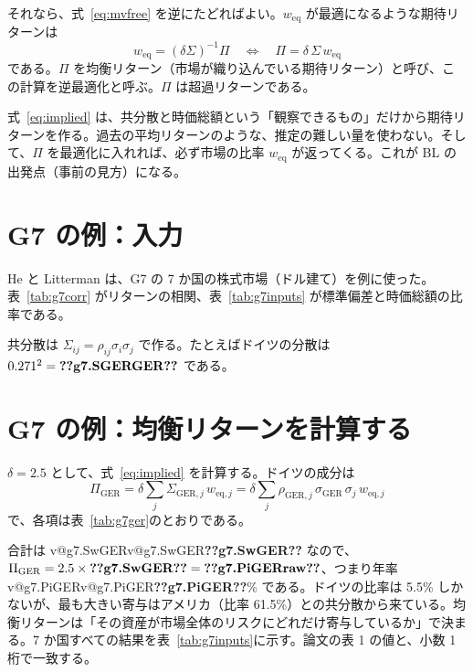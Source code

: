 \documentclass[xelatex,ja=standard,jafont=hiragino-pron,a4paper,11pt,openany]{bxjsreport}
\makeatletter
\newcommand{\V}[1]{\ifcsname v@#1\endcsname\csname v@#1\endcsname\else\textbf{??#1??}\fi}
\newcommand{\tabin}[1]{\adjustbox{max width=\linewidth}{}}
\newcommand{\weq}{w_{\mathrm{eq}}}
\newcommand{\tabref}[1]{表~\ref{#1}}
\makeatother
\begin{document}
それなら、式~\eqref{eq:mvfree} を逆にたどればよい。$\weq$ が最適になるような期待リターンは
\begin{equation}
\weq = (\delta\Sigma)^{-1}\Pi
\quad\Longleftrightarrow\quad
\Pi = \delta\,\Sigma\,\weq
\label{eq:implied}
\end{equation}
である。$\Pi$ を均衡リターン（市場が織り込んでいる期待リターン）と呼び、この計算を逆最適化と呼ぶ。$\Pi$ は超過リターンである。

式~\eqref{eq:implied} は、共分散と時価総額という「観察できるもの」だけから期待リターンを作る。過去の平均リターンのような、推定の難しい量を使わない。そして、$\Pi$ を最適化に入れれば、必ず市場の比率 $\weq$ が返ってくる。これが BL の出発点（事前の見方）になる。

\section{G7 の例：入力}

He と Litterman は、G7 の 7 か国の株式市場（ドル建て）を例に使った。\tabref{tab:g7corr} がリターンの相関、\tabref{tab:g7inputs} が標準偏差と時価総額の比率である。

\begin{table}[htbp]
\centering
\caption{G7 の株式市場のリターンの相関（He と Litterman の表 1）。}
\label{tab:g7corr}
\small\tabin{g7_corr}
\end{table}

共分散は $\Sigma_{ij} = \rho_{ij}\sigma_i\sigma_j$ で作る。たとえばドイツの分散は $0.271^2 = \V{g7.SGERGER}$ である。

\section{G7 の例：均衡リターンを計算する}

$\delta = 2.5$ として、式~\eqref{eq:implied} を計算する。ドイツの成分は
\[
\Pi_{\mathrm{GER}} = \delta\sum_j \Sigma_{\mathrm{GER},j}\, w_{\mathrm{eq},j}
= \delta\sum_j \rho_{\mathrm{GER},j}\,\sigma_{\mathrm{GER}}\,\sigma_j\, w_{\mathrm{eq},j}
\]
で、各項は\tabref{tab:g7ger}のとおりである。

\begin{table}[htbp]
\centering
\caption{ドイツの均衡リターンの計算。最後の列を足して $\delta = 2.5$ を掛ける。}
\label{tab:g7ger}
\small\tabin{g7_ger}
\end{table}

合計は \V{g7.SwGER} なので、$\Pi_{\mathrm{GER}} = 2.5 \times \V{g7.SwGER} = \V{g7.PiGERraw}$、つまり年率 \V{g7.PiGER}\% である。ドイツの比率は 5.5\% しかないが、最も大きい寄与はアメリカ（比率 61.5\%）との共分散から来ている。均衡リターンは「その資産が市場全体のリスクにどれだけ寄与しているか」で決まる。7 か国すべての結果を\tabref{tab:g7inputs}に示す。論文の表 1 の値と、小数 1 桁で一致する。
\end{document}
